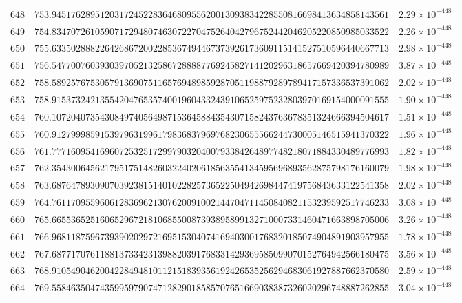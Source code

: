 \documentclass[12pt,reqno]{amsart}
\theoremstyle{remark}
\begin{document}
\begin{longtable}{clc}
$648$ & $753.9451762895120317245228364680955620013093834228550816698413634858143561$ & $2.29\times 10^{-448}$ \\
$649$ & $754.8347072610590717294807463072270475264042796752442046205220850985033522$ & $2.26\times 10^{-448}$ \\
$650$ & $755.6335028882264268672002285367494467373926173609115141527510596440667713$ & $2.98\times 10^{-448}$ \\
$651$ & $756.5477007603930397052132586728888776924582714120296318657669420394780989$ & $3.87\times 10^{-448}$ \\
$652$ & $758.5892576753057913690751165769489859287051198879289789417157336537391062$ & $2.02\times 10^{-448}$ \\
$653$ & $758.9153732421355420476535740019604332439106525975232803970169154000091555$ & $1.90\times 10^{-448}$ \\
$654$ & $760.1072040735430849740564987153645884354307158243763678351324666394504617$ & $1.51\times 10^{-448}$ \\
$655$ & $760.9127999859153979631996179836837969768230655566244730005146515941370322$ & $1.96\times 10^{-448}$ \\
$656$ & $761.7771609541696072532517299790320400793384264897748218071884330489776993$ & $1.82\times 10^{-448}$ \\
$657$ & $762.3543006456217951751482603224020618563554134595696893562875798176160079$ & $1.98\times 10^{-448}$ \\
$658$ & $763.6876478930907039238151401022825736522504942698447419756843633122541358$ & $2.02\times 10^{-448}$ \\
$659$ & $764.7611709559606128369621307620091002144704711450840821153239592517746233$ & $3.08\times 10^{-448}$ \\
$660$ & $765.6655365251606529672181068550087393895899132710007331460471663898705006$ & $3.26\times 10^{-448}$ \\
$661$ & $766.9681187596739390202972169515304074169403001768320185074904891903957955$ & $1.78\times 10^{-448}$ \\
$662$ & $767.6877170761188137334231398820391768331429369585099070152764942566180475$ & $3.56\times 10^{-448}$ \\
$663$ & $768.9105490462004228494810112151839356192426535256294683061927887662370580$ & $2.59\times 10^{-448}$ \\
$664$ & $769.5584635047435995979074712829018585707651669038387326020296748887262855$ & $3.04\times 10^{-448}$ \\

\end{longtable}
\end{document}
